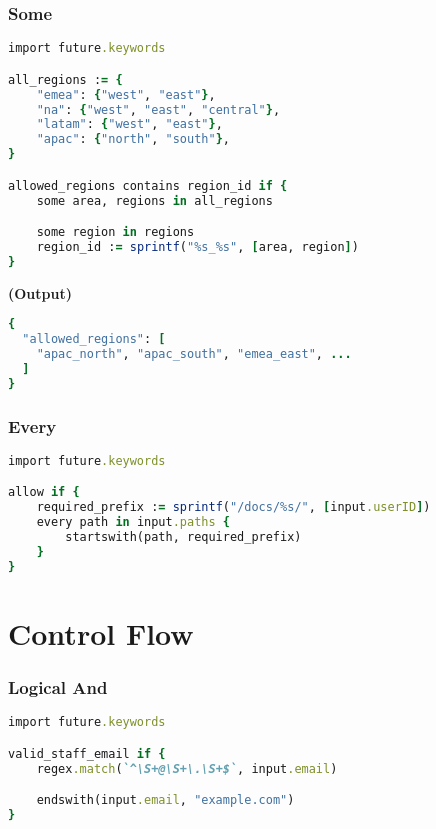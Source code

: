 \documentclass[twocolumn]{article}
\begin{document}
\vspace{-1em}
\subsubsection*{Some}

\begin{lstlisting}[language=Ruby]
import future.keywords

all_regions := {
	"emea": {"west", "east"},
	"na": {"west", "east", "central"},
	"latam": {"west", "east"},
	"apac": {"north", "south"},
}

allowed_regions contains region_id if {
	some area, regions in all_regions

	some region in regions
	region_id := sprintf("%s_%s", [area, region])
}
\end{lstlisting}



\textbf{\tiny{(Output)}}
\begin{lstlisting}[language=Ruby]
{
  "allowed_regions": [
    "apac_north", "apac_south", "emea_east", ...
  ]
}
\end{lstlisting}



\vspace{-1em}
\subsubsection*{Every}

\begin{lstlisting}[language=Ruby]
import future.keywords

allow if {
	required_prefix := sprintf("/docs/%s/", [input.userID])
	every path in input.paths {
		startswith(path, required_prefix)
	}
}
\end{lstlisting}






\section*{Control Flow}




\vspace{-1em}
\subsubsection*{Logical And}

\begin{lstlisting}[language=Ruby]
import future.keywords

valid_staff_email if {
	regex.match(`^\S+@\S+\.\S+$`, input.email)

	endswith(input.email, "example.com")
}
\end{lstlisting}
\end{document}
